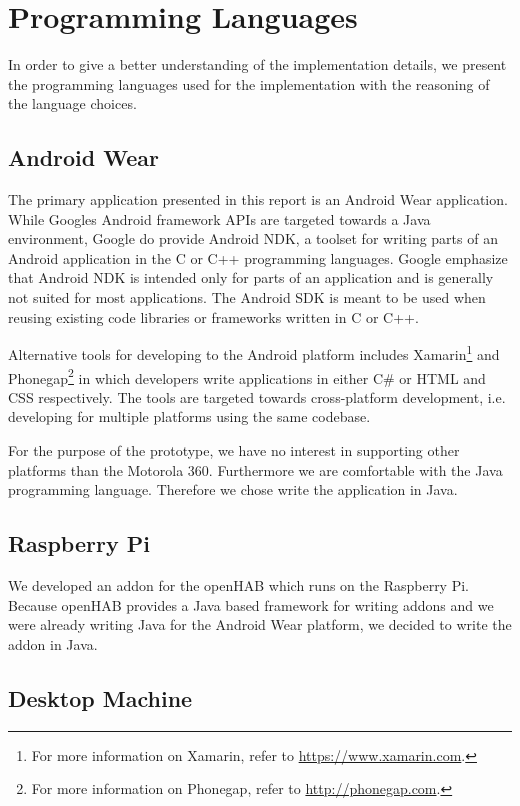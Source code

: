 \section{Programming Languages}
\label{sec:implementation:programming-language}

In order to give a better understanding of the implementation details, we present the programming languages used for the implementation with the reasoning of the language choices.

\subsection{Android Wear}

The primary application presented in this report is an Android Wear application. While Googles Android framework APIs are targeted towards a Java environment, Google do provide Android NDK, a toolset for writing parts of an Android application in the C or C++ programming languages. Google emphasize that Android NDK is intended only for parts of an application and is generally not suited for most applications. The Android SDK is meant to be used when reusing existing code libraries or frameworks written in C or C++.

Alternative tools for developing to the Android platform includes Xamarin\footnote{For more information on Xamarin, refer to \url{https://www.xamarin.com}.} and Phonegap\footnote{For more information on Phonegap, refer to \url{http://phonegap.com}.} in which developers write applications in either C\# or HTML and CSS respectively. The tools are targeted towards cross-platform development, i.e. developing for multiple platforms using the same codebase.

For the purpose of the prototype, we have no interest in supporting other platforms than the Motorola 360. Furthermore we are comfortable with the Java programming language. Therefore we chose write the application in Java.

\subsection{Raspberry Pi}

We developed an addon for the openHAB which runs on the Raspberry Pi. Because openHAB provides a Java based framework for writing addons and we were already writing Java for the Android Wear platform, we decided to write the addon in Java.

\subsection{Desktop Machine}

